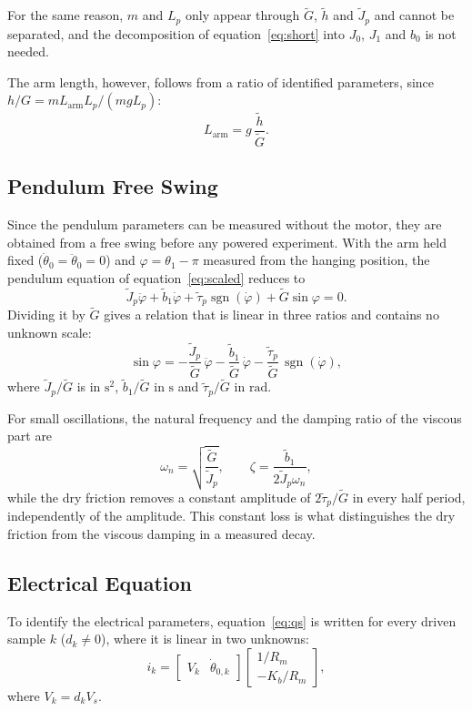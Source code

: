 \documentclass[a4paper,11pt]{article}
\newcommand{\La}{L_{\mathrm{arm}}}
\newcommand{\sgn}{\operatorname{sgn}}
\begin{document}
For the same reason, $m$ and $L_p$ only appear through $\tilde G$, $\tilde h$ and $\tilde J_p$ and cannot be separated, and the decomposition of equation~\ref{eq:short} into $J_0$, $J_1$ and $b_0$ is not needed.

The arm length, however, follows from a ratio of identified parameters, since $h/G = m \La L_p / (m g L_p)$:
\begin{equation}
  \La = g\, \frac{\tilde h}{\tilde G} .
  \label{eq:Larm}
\end{equation}

\subsection{Pendulum Free Swing}
Since the pendulum parameters can be measured without the motor, they are obtained from a free swing before any powered experiment. With the arm held fixed ($\dot\theta_0 = \ddot\theta_0 = 0$) and $\varphi = \theta_1 - \pi$ measured from the hanging position, the pendulum equation of equation~\ref{eq:scaled} reduces to
\begin{equation}
  \tilde J_p \ddot\varphi + \tilde b_1 \dot\varphi + \tilde\tau_p \sgn(\dot\varphi) + \tilde G \sin\varphi = 0 .
\end{equation}
Dividing it by $\tilde G$ gives a relation that is linear in three ratios and contains no unknown scale:
\begin{equation}
  \sin\varphi = -\frac{\tilde J_p}{\tilde G}\,\ddot\varphi - \frac{\tilde b_1}{\tilde G}\,\dot\varphi - \frac{\tilde\tau_p}{\tilde G}\,\sgn(\dot\varphi) ,
  \label{eq:swing}
\end{equation}
where $\tilde J_p/\tilde G$ is in $\mathrm{s^2}$, $\tilde b_1/\tilde G$ in $\mathrm{s}$ and $\tilde\tau_p/\tilde G$ in $\mathrm{rad}$.

For small oscillations, the natural frequency and the damping ratio of the viscous part are
\begin{equation}
  \omega_n = \sqrt{\frac{\tilde G}{\tilde J_p}}, \qquad \zeta = \frac{\tilde b_1}{2 \tilde J_p \omega_n} ,
\end{equation}
while the dry friction removes a constant amplitude of $2\tilde\tau_p/\tilde G$ in every half period, independently of the amplitude. This constant loss is what distinguishes the dry friction from the viscous damping in a measured decay.

\subsection{Electrical Equation}
To identify the electrical parameters, equation~\ref{eq:qs} is written for every driven sample $k$ ($d_k \neq 0$), where it is linear in two unknowns:
\begin{equation}
  i_k = \begin{bmatrix} V_k & \dot\theta_{0,k} \end{bmatrix} \begin{bmatrix} 1/R_m \\ -K_b/R_m \end{bmatrix} ,
  \label{eq:elec_reg}
\end{equation}
where $V_k = d_k V_s$.
\end{document}
